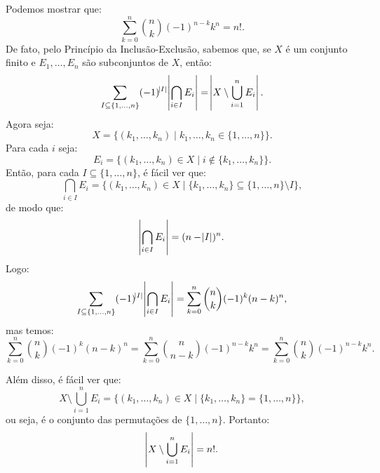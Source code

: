 \documentclass[11pt,a4paper]{article}
\begin{document}
\dividiritens{\task[\pers{b}]} Podemos mostrar que:
\[
\sum\limits_{k=0}^n\binom{n}{k}(-1)^{n-k}k^n=n!.
\]
De fato, pelo Princípio da Inclusão-Exclusão, sabemos que, se $X$ é um conjunto finito e $E_1,\dots,E_n$ são subconjuntos de $X$, então:
\[
\sum_{I\subseteq\{1,\dots,n\}}(-1)^{\abs{I}}\abs{\bigcap_{i\in I}E_i}=\abs{X\setminus\bigcup_{i=1}^nE_i}.
\]
Agora seja:
\[
X=\{(k_1,\dots,k_n)\mid k_1,\dots,k_n\in\{1,\dots,n\}\}.
\]
Para cada $i$ seja:
\[
E_i=\{(k_1,\dots,k_n)\in X\mid i\notin\{k_1,\dots,k_n\}\}.
\]
Então, para cada $I\subseteq\{1,\dots,n\}$, é fácil ver que:
\[
\bigcap_{i\in I}E_i=\{(k_1,\dots,k_n)\in X\mid \{k_1,\dots,k_n\}\subseteq\{1,\dots,n\}\setminus I\},
\]
de modo que:
\[
\abs{\bigcap_{i\in I}E_i}=(n-\abs{I})^n.
\]
Logo:
\[
\sum_{I\subseteq\{1,\dots,n\}}(-1)^{\abs{I}}\abs{\bigcap_{i\in I}E_i}=\sum_{k=0}^n\binom{n}{k}(-1)^k(n-k)^n,
\]
mas temos:
\[
\sum_{k=0}^n\binom{n}{k}(-1)^k(n-k)^n=\sum_{k=0}^n\binom{n}{n-k}(-1)^{n-k}k^n=\sum_{k=0}^n\binom{n}{k}(-1)^{n-k}k^n.
\]

\noindent
Além disso, é fácil ver que:
\[
X\setminus\bigcup_{i=1}^nE_i=\{(k_1,\dots,k_n)\in X\mid\{k_1,\dots,k_n\}=\{1,\dots,n\}\},
\]
ou seja, é o conjunto das permutações de $\{1,\dots,n\}$. Portanto:
\[
\abs{X\setminus\bigcup_{i=1}^nE_i}=n!.
\]
\end{document}
